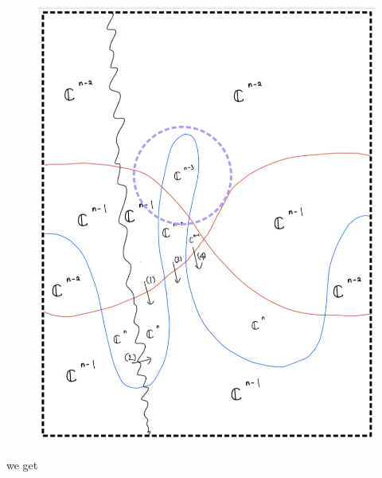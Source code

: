 \begin{enumerate}[label=(Step \arabic*)]
\begin{figure}[H]
    \centering
    \includegraphics[scale = 0.85]{diagrams/cobord'8/6.png}
    \caption{}
    \label{fig:your-label}
\end{figure}
\pagebreak
we get


\end{enumerate}
